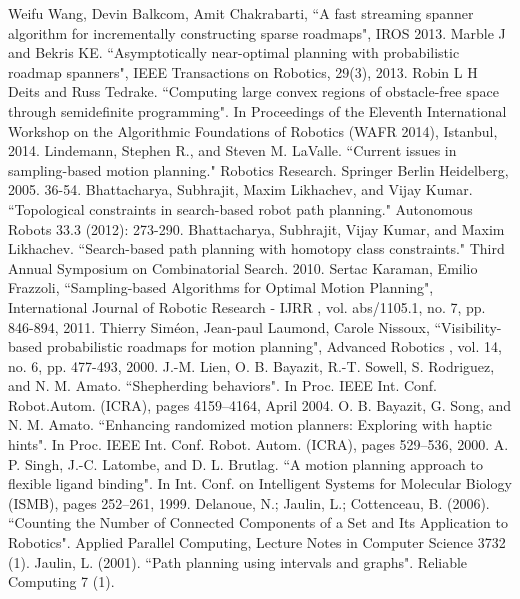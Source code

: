 \documentclass[11pt]{article}
\begin{document}

\begin{thebibliography}{1}
   Weifu Wang, Devin Balkcom, Amit Chakrabarti, ``A fast streaming spanner algorithm for incrementally constructing sparse roadmaps", IROS 2013.
   Marble J and Bekris KE. ``Asymptotically near-optimal planning with probabilistic roadmap spanners", IEEE Transactions on Robotics, 29(3), 2013.
   Robin L H Deits and Russ Tedrake. ``Computing large convex regions of obstacle-free space through semidefinite programming". In Proceedings of the Eleventh International Workshop on the Algorithmic Foundations of Robotics (WAFR 2014), Istanbul, 2014.
   Lindemann, Stephen R., and Steven M. LaValle. ``Current issues in sampling-based motion planning." Robotics Research. Springer Berlin Heidelberg, 2005. 36-54.
   Bhattacharya, Subhrajit, Maxim Likhachev, and Vijay Kumar. ``Topological constraints in search-based robot path planning." Autonomous Robots 33.3 (2012): 273-290.
   Bhattacharya, Subhrajit, Vijay Kumar, and Maxim Likhachev. ``Search-based path planning with homotopy class constraints." Third Annual Symposium on Combinatorial Search. 2010.
   Sertac Karaman, Emilio Frazzoli, ``Sampling-based Algorithms for Optimal Motion Planning", International Journal of Robotic Research - IJRR , vol. abs/1105.1, no. 7, pp. 846-894, 2011.
   Thierry Siméon, Jean-paul Laumond, Carole Nissoux, ``Visibility-based probabilistic roadmaps for motion planning", Advanced Robotics , vol. 14, no. 6, pp. 477-493, 2000.
   J.-M. Lien, O. B. Bayazit, R.-T. Sowell, S. Rodriguez, and N. M. Amato. ``Shepherding behaviors". In Proc. IEEE Int. Conf. Robot.Autom. (ICRA), pages 4159–4164, April 2004.
   O. B. Bayazit, G. Song, and N. M. Amato. ``Enhancing randomized motion planners: Exploring with haptic hints". In Proc. IEEE Int. Conf. Robot. Autom. (ICRA), pages 529–536, 2000.
   A. P. Singh, J.-C. Latombe, and D. L. Brutlag. ``A motion planning approach to flexible ligand binding". In Int. Conf. on Intelligent Systems for Molecular Biology (ISMB), pages 252–261, 1999.
   Delanoue, N.; Jaulin, L.; Cottenceau, B. (2006). ``Counting the Number of Connected Components of a Set and Its Application to Robotics". Applied Parallel Computing, Lecture Notes in Computer Science 3732 (1).
   Jaulin, L. (2001). ``Path planning using intervals and graphs". Reliable Computing 7 (1).  

\end{thebibliography}
\end{document}
